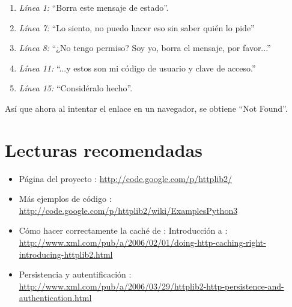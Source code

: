 \begin{enumerate}

\item \emph{Línea 1:} ``Borra este mensaje de estado''.

\item \emph{Línea 7:} ``Lo siento, no puedo hacer eso sin saber quién lo pide''

\item \emph{Línea 8:} ``¿No tengo permiso? Soy yo, borra el mensaje, por favor...''

\item \emph{Línea 11:} ``...y estos son mi código de usuario y clave de acceso.''

\item \emph{Línea 15:} ``Considéralo hecho''.

\end{enumerate}


Así que ahora al intentar el enlace  en un navegador, se obtiene ``Not Found''.

\section{Lecturas recomendadas}


\noindent {}

\begin{itemize}

\item Página del proyecto : \newline \href{http://code.google.com/p/httplib2/}{http://code.google.com/p/httplib2/}

\item Más ejemplos de código : \newline \href{http://code.google.com/p/httplib2/wiki/ExamplesPython3}{http://code.google.com/p/httplib2/wiki/ExamplesPython3}

\item Cómo hacer correctamente la caché de : Introducción a : \newline \href{http://www.xml.com/pub/a/2006/02/01/doing-http-caching-right-introducing-httplib2.html}{http://www.xml.com/pub/a/2006/02/01/doing-http-caching-right-introdu\allowbreak cing-httplib2.html}

\item {} Persistencia y autentificación : \newline \href{http://www.xml.com/pub/a/2006/03/29/httplib2-http-persistence-and-authentication.html}{http://www.xml.com/pub/a/2006/03/29/httplib2-http-persistence-and-authen\allowbreak tication.html}

\end{itemize} 

